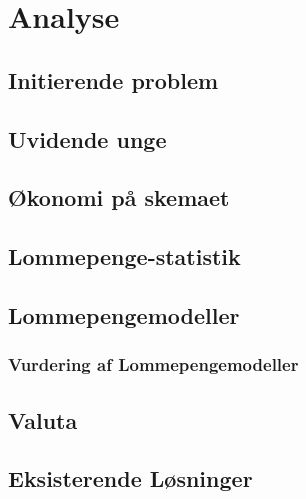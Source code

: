 





\tableofcontents

\chapter{Analyse}


\section{Initierende problem}


\section{Uvidende unge}
\label{UvidendeUnge}


\section{Økonomi på skemaet}
\label{Okonomi}


\section{Lommepenge-statistik}
\label{LommeStat}


\section{Lommepengemodeller}
\label{LommeModeller}

\subsection{Vurdering af Lommepengemodeller}
\label{ModelVurdering}


\section{Valuta}
\label{Valuta}


\section{Eksisterende Løsninger}

